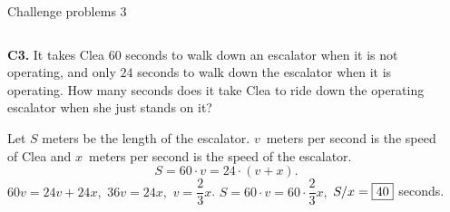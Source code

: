\documentclass[9pt,aspectratio=169]{beamer}
\begin{document}
\begin{frame}{Challenge problems 3}
  \begin{columns}[T]
    \begin{column}{0.5\textwidth}
      \begin{problem}
        \textbf{C3.} It takes Clea $60$ seconds to walk down an escalator when it is not operating, and only $24$ seconds to walk down the escalator when it is operating. How many seconds does it take Clea to ride down the operating escalator when she just stands on it?
      \end{problem}\pause
      Let $S$ meters be the length of the escalator. $v$~meters per second is the speed of Clea and $x$~meters per second is the speed of the escalator.
      \[ S = 60 \cdot v = 24 \cdot (v + x). \] \pause
      $60 v = 24 v + 24 x,$ $36 v = 24 x,$ $v = \dfrac{2}{3}x$.
      $ S = 60 \cdot v = 60 \cdot \dfrac{2}{3} x,$ $S/x = \fbox{40}$ seconds.\pause
    \end{column}
    \begin{column}{0.5\textwidth}
    \end{column}
  \end{columns}
\end{frame}
\end{document}
